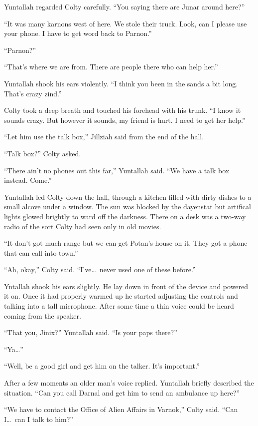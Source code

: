 Yuntallah regarded Colty carefully. ``You saying there are Junar around here?''

``It was many karnons west of here. We stole their truck. Look, can I please use your phone. I
have to get word back to Parnon.''

``Parnon?''

``That's where we are from. There are people there who can help her.''

Yuntallah shook his ears violently. ``I think you been in the sands a bit long. That's crazy
zind.''

Colty took a deep breath and touched his forehead with his trunk. ``I know it sounds crazy. But
however it sounds, my friend is hurt. I need to get her help.''

``Let him use the talk box,'' Jillziah said from the end of the hall.

``Talk box?'' Colty asked.

``There ain't no phones out this far,'' Yuntallah said. ``We have a talk box instead. Come.''

Yuntallah led Colty down the hall, through a kitchen filled with dirty dishes to a small alcove
under a window. The sun was blocked by the dayenstat but artifical lights glowed brightly to
ward off the darkness. There on a desk was a two-way radio of the sort Colty had seen only in
old movies.

``It don't got much range but we can get Potan's house on it. They got a phone that can call
into town.''

``Ah, okay,'' Colty said. ``I've\ldots\ never used one of these before.''

Yntallah shook his ears slightly. He lay down in front of the device and powered it on. Once it
had properly warmed up he started adjusting the controls and talking into a tall microphone.
After some time a thin voice could be heard coming from the speaker.

``That you, Jinix?'' Yuntallah said. ``Is your paps there?''

``Ya\ldots''

``Well, be a good girl and get him on the talker. It's important.''

After a few moments an older man's voice replied. Yuntallah briefly described the situation.
``Can you call Darnal and get him to send an ambulance up here?''

``We have to contact the Office of Alien Affairs in Varnok,'' Colty said. ``Can I\ldots\ can I
talk to him?''


